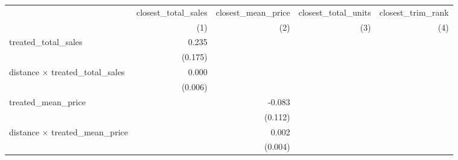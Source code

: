 \begin{tabular}{lrrrr}
\toprule
                                        & \multicolumn{1}{c}{closest\_total\_sales} & \multicolumn{1}{c}{closest\_mean\_price} & \multicolumn{1}{c}{closest\_total\_units} & \multicolumn{1}{c}{closest\_trim\_rank} \\ 
\cmidrule(lr){2-2} \cmidrule(lr){3-3} \cmidrule(lr){4-4} \cmidrule(lr){5-5} 
                                        &                                       (1) &                                      (2) &                                       (3) &                                     (4) \\ 
\midrule
treated\_total\_sales                   &                                     0.235 &                                          &                                           &                                         \\ 
                                        &                                   (0.175) &                                          &                                           &                                         \\ 
distance $\times$ treated\_total\_sales &                                     0.000 &                                          &                                           &                                         \\ 
                                        &                                   (0.006) &                                          &                                           &                                         \\ 
treated\_mean\_price                    &                                           &                                   -0.083 &                                           &                                         \\ 
                                        &                                           &                                  (0.112) &                                           &                                         \\ 
distance $\times$ treated\_mean\_price  &                                           &                                    0.002 &                                           &                                         \\ 
                                        &                                           &                                  (0.004) &                                           &                                         \\ 

\end{tabular}

